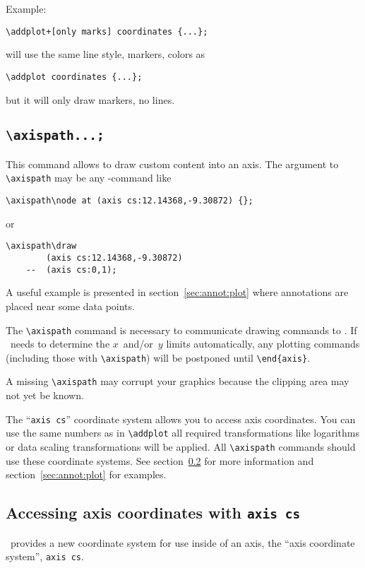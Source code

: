 Example:
\begin{lstlisting}
\addplot+[only marks] coordinates {...};
\end{lstlisting}
will use the same line style, markers, colors as
\begin{lstlisting}
\addplot coordinates {...};
\end{lstlisting}
but it will only draw markers, no lines.

\subsection{\texttt{\textbackslash axispath...;}}
\label{sec:axispath}%
This command allows to draw custom content into an axis. The argument to \lstinline!\axispath! may be any \Tikz-command like 
\begin{lstlisting}
\axispath\node at (axis cs:12.14368,-9.30872) {};
\end{lstlisting}
or
\begin{lstlisting}
\axispath\draw 
		(axis cs:12.14368,-9.30872) 
	--	(axis cs:0,1);
\end{lstlisting}
A useful example is presented in section~\ref{sec:annot:plot} where annotations are placed near some data points.

The \lstinline!\axispath! command is necessary to communicate drawing commands to \PGFPlots. If \PGFPlots\ needs to determine the $x$~and/or~$y$ limits automatically, any plotting commands (including those with \lstinline!\axispath!) will be postponed until \lstinline!\end{axis}!.

A missing \lstinline!\axispath! may corrupt your graphics because the clipping area may not yet be known.

The ``\texttt{axis cs}'' coordinate system allows you to access axis coordinates. You can use the same numbers as in \lstinline!\addplot! all required transformations like logarithms or data scaling transformations will be applied. All \lstinline!\axispath! commands should use these coordinate systems. See section~\ref{sec:axis:coords} for more information and section~\ref{sec:annot:plot} for examples. 

\subsection{Accessing axis coordinates with \texttt{axis cs}}
\label{sec:axis:coords}%
\PGFPlots\ provides a new coordinate system for use inside of an axis, the ``axis coordinate system'', \texttt{axis cs}.

